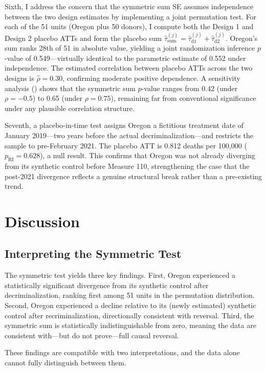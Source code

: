 \documentclass[12pt]{article}
\begin{document}
Sixth, I address the concern that the symmetric sum SE assumes independence between the two design estimates by implementing a joint permutation test. For each of the 51 units (Oregon plus 50 donors), I compute both the Design 1 and Design 2 placebo ATTs and form the placebo sum $\hat{\tau}_{\text{sum}}^{(j)} = \hat{\tau}_{\text{d1}}^{(j)} + \hat{\tau}_{\text{d2}}^{(j)}$. Oregon's sum ranks 28th of 51 in absolute value, yielding a joint randomization inference $p$-value of 0.549---virtually identical to the parametric estimate of 0.552 under independence. The estimated correlation between placebo ATTs across the two designs is $\hat{\rho} = 0.30$, confirming moderate positive dependence. A sensitivity analysis () shows that the symmetric sum $p$-value ranges from 0.42 (under $\rho = -0.5$) to 0.65 (under $\rho = 0.75$), remaining far from conventional significance under any plausible correlation structure.

Seventh, a placebo-in-time test assigns Oregon a fictitious treatment date of January 2019---two years before the actual decriminalization---and restricts the sample to pre-February 2021. The placebo ATT is 0.812 deaths per 100,000 ($p_{\text{RI}} = 0.628$), a null result. This confirms that Oregon was not already diverging from its synthetic control before Measure 110, strengthening the case that the post-2021 divergence reflects a genuine structural break rather than a pre-existing trend.


\section{Discussion}

\subsection{Interpreting the Symmetric Test}

The symmetric test yields three key findings. First, Oregon experienced a statistically significant divergence from its synthetic control after decriminalization, ranking first among 51 units in the permutation distribution. Second, Oregon experienced a decline relative to its (newly estimated) synthetic control after recriminalization, directionally consistent with reversal. Third, the symmetric sum is statistically indistinguishable from zero, meaning the data are consistent with---but do not prove---full causal reversal.

These findings are compatible with two interpretations, and the data alone cannot fully distinguish between them.
\end{document}
